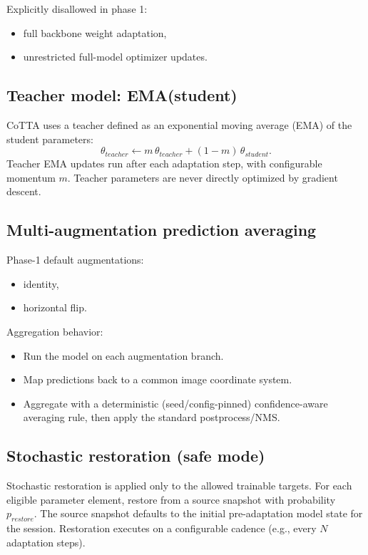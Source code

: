 Explicitly disallowed in phase 1:
\begin{itemize}
  \item full backbone weight adaptation,
  \item unrestricted full-model optimizer updates.
\end{itemize}

\subsection{Teacher model: EMA(student)}
CoTTA uses a teacher defined as an exponential moving average (EMA) of the student parameters:
\[
\theta_{teacher} \leftarrow m\,\theta_{teacher} + (1-m)\,\theta_{student}.
\]
Teacher EMA updates run after each adaptation step, with configurable momentum $m$.
Teacher parameters are never directly optimized by gradient descent.

\subsection{Multi-augmentation prediction averaging}
Phase-1 default augmentations:
\begin{itemize}
  \item identity,
  \item horizontal flip.
\end{itemize}

Aggregation behavior:
\begin{itemize}
  \item Run the model on each augmentation branch.
  \item Map predictions back to a common image coordinate system.
  \item Aggregate with a deterministic (seed/config-pinned) confidence-aware averaging rule, then apply the standard postprocess/NMS.
\end{itemize}

\subsection{Stochastic restoration (safe mode)}
Stochastic restoration is applied only to the allowed trainable targets.
For each eligible parameter element, restore from a source snapshot with probability $p_{restore}$.
The source snapshot defaults to the initial pre-adaptation model state for the session.
Restoration executes on a configurable cadence (e.g., every $N$ adaptation steps).

